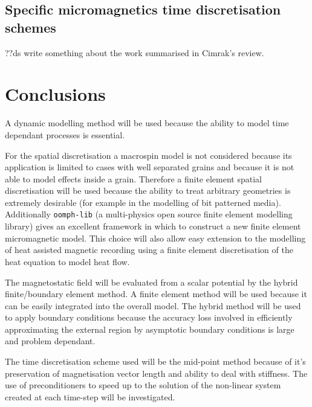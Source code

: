 
\subsection{Specific micromagnetics time discretisation schemes}

??ds write something about the work summarised in Cimrak's review.

\section{Conclusions}
\label{sec:model-conclusions}

A dynamic modelling method will be used because the ability to model time dependant processes is essential.

For the spatial discretisation a macrospin model is not considered because its application is limited to cases with well separated grains and because it is not able to model effects inside a grain. Therefore a finite element spatial discretisation will be used because the ability to treat arbitrary geometries is extremely desirable (for example in the modelling of bit patterned media). Additionally \texttt{oomph-lib}\cite{oomph-lib-website} (a multi-physics open source finite element modelling library) gives an excellent framework in which to construct a new finite element micromagnetic model. This choice will also allow easy extension to the modelling of heat assisted magnetic recording using a finite element discretisation of the heat equation to model heat flow.

The magnetostatic field will be evaluated from a scalar potential by the hybrid finite/boundary element method. A finite element method will be used because it can be easily integrated into the overall model. The hybrid method will be used to apply boundary conditions because the accuracy loss involved in efficiently approximating the external region by asymptotic boundary conditions is large and problem dependant.

The time discretisation scheme used will be the mid-point method because of it's preservation of magnetisation vector length and ability to deal with stiffness. The use of preconditioners to speed up to the solution of the non-linear system created at each time-step will be investigated.

